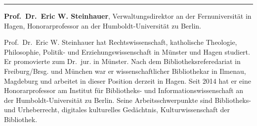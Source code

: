 \begin{center}\rule{0.5\linewidth}{\linethickness}\end{center}

\textbf{Prof.~Dr.~Eric W. Steinhauer}, Verwaltungsdirektor an der
Fernuniversität in Hagen, Honorarprofessor an der Humboldt-Universität
zu Berlin.

Prof.~Dr.~Eric W. Steinhauer hat Rechtswissenschaft, katholische
Theologie, Philosophie, Politik- und Erziehungswissenschaft in Münster
und Hagen studiert. Er promovierte zum Dr.~jur. in Münster. Nach dem
Bibliotheksreferedariat in Freiburg/Brsg. und München war er
wissenschaftlicher Bibliothekar in Ilmenau, Magdeburg und arbeitet in
dieser Position derzeit in Hagen. Seit 2014 hat er eine Honorarprofessor
am Institut für Bibliotheks- und Informationswissenschaft an der
Humboldt-Universität zu Berlin. Seine Arbeitsschwerpunkte sind
Bibliotheks- und Urheberrecht, digitales kulturelles Gedächtnis,
Kulturwissenschaft der Bibliothek.
